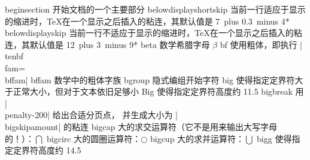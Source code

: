 \capcs beginsection {开始文档的一个主要部分}{}{\@beginsection}
\capcs belowdisplayshortskip {当前一行适应于显示的缩进时，\TeX 在一个显示之后插入的粘连，其默认值是 7\pt\ plus 0.3\pt\ minus 4\pt}*{}%
\capcs belowdisplayskip {当前一行不适应于显示的缩进时，\TeX 在一个显示之后插入的粘连，其默认值是  12\pt\ plus 3\pt\ minus 9\pt}*{}%
\capcs beta {数学希腊字母 $\beta$}{}{}
\capcs bf {使用粗体，即执行 |\\tenbf\\fam=\\bffam|}{}{}
\capcs bffam {数学中的粗体字族}{}{}
\capcs bgroup {隐式编组开始字符}{}{}
\capcs big {使得指定定界符大于正常大小，但对于文本依旧足够小}{}{}%
\capcs Big {使得指定定界符高度约 11.5\pt}{}{}
\capcs bigbreak {用 |\\penalty-200| 给出合适分页点，
    并生成大小为 |\\bigskipamount| 的粘连}{}{}
\capcs bigcap {大的求交运算符（它不是用来输出大写字母的！）：$\bigcap$}{}{}
\capcs bigcirc {大的圆圈运算符：$\bigcirc$}{}{}%
\capcs bigcup {大的求并运算符：$\bigcup$}{}{}%
\capcs bigg {使得指定定界符高度约 14.5\pt}{}{}
